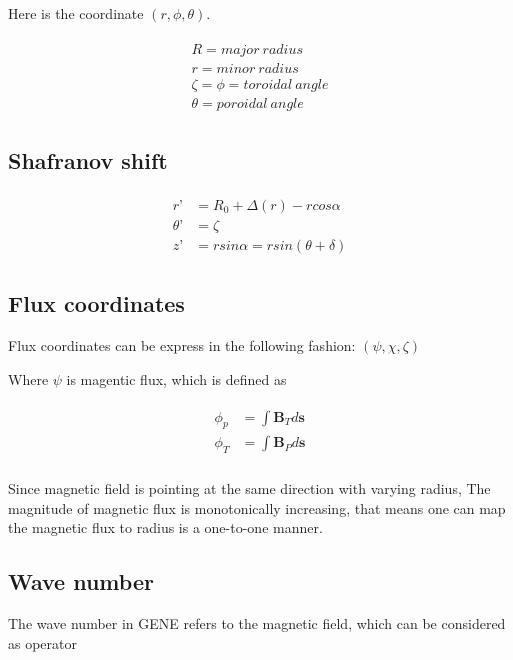 Here is the coordinate $(r, \phi, \theta)$. 

\begin{eqnarray}
\begin{aligned}
    R=major\ radius\\
    r= minor\ radius\\
    \zeta=\phi= toroidal\ angle\\
    \theta = poroidal\ angle
\end{aligned}
\end{eqnarray}

\subsection{Shafranov shift}

\begin{eqnarray}
     \begin{aligned}
      r’{}&=R_0+\Delta(r)-r cos\alpha\\
      \theta’&=\zeta\\
      z’&=r sin\alpha=r sin(\theta+\delta)
     \end{aligned}
\end{eqnarray}

\subsection{Flux coordinates}

Flux coordinates can be express in the following fashion: $(\psi, \chi, \zeta)$

Where $\psi$ is magentic flux, which is defined as 

\begin{eqnarray}
\begin{aligned}
   \phi_p{}&=\int \textbf{B}_Td\textbf{s}\\
   \phi_T&=\int \textbf{B}_Pd\textbf{s}\\
\end{aligned}
\end{eqnarray}

Since magnetic field is pointing at the same direction with varying radius, The magnitude of magnetic flux is monotonically increasing, that means one can map the magnetic flux to radius is a one-to-one manner. 

\subsection{Wave number}
The wave number in GENE refers to the magnetic field, which can be considered as operator 

